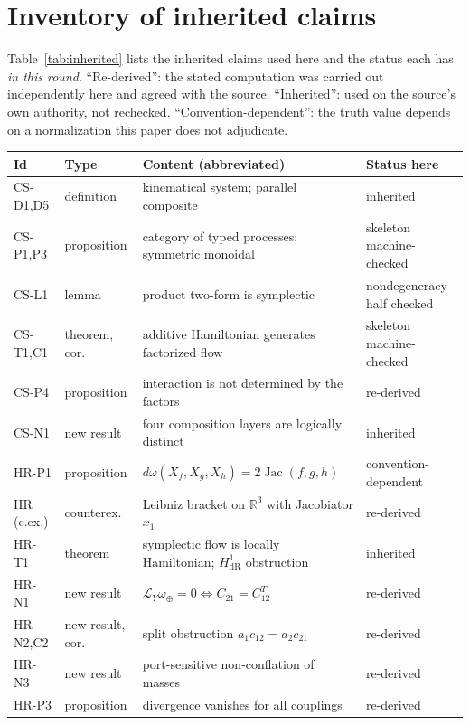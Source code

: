 \documentclass[11pt]{article}
\theoremstyle{plain}
\newcommand{\R}{\mathbb{R}}
\newcommand{\Lie}{\mathcal{L}}
\begin{document}
\section{Inventory of inherited claims}
\label{sec:inventory}

Table~\ref{tab:inherited} lists the inherited claims used here and the status
each has \emph{in this round}. ``Re-derived'': the stated computation was
carried out independently here and agreed with the source. ``Inherited'': used
on the source's own authority, not rechecked. ``Convention-dependent'': the
truth value depends on a normalization this paper does not adjudicate.

\begin{table}[h]
\centering
\footnotesize
\begin{tabular}{@{}llp{6.6cm}l@{}}
\toprule
Id & Type & Content (abbreviated) & Status here \\
\midrule
CS-D1,D5 & definition & kinematical system; parallel composite & inherited \\
CS-P1,P3 & proposition & category of typed processes; symmetric monoidal & skeleton machine-checked \\
CS-L1 & lemma & product two-form is symplectic & nondegeneracy half checked \\
CS-T1,C1 & theorem, cor. & additive Hamiltonian generates factorized flow & skeleton machine-checked \\
CS-P4 & proposition & interaction is not determined by the factors & re-derived \\
CS-N1 & new result & four composition layers are logically distinct & inherited \\
HR-P1 & proposition & $d\omega(X_f,X_g,X_h)=2\operatorname{Jac}(f,g,h)$ & convention-dependent \\
HR (c.ex.) & counterex. & Leibniz bracket on $\R^3$ with Jacobiator $x_1$ & re-derived \\
HR-T1 & theorem & symplectic flow is locally Hamiltonian; $H^1_{\mathrm{dR}}$ obstruction & inherited \\
HR-N1 & new result & $\Lie_Y\omega_\oplus=0 \iff C_{21}=C_{12}^{T}$ & re-derived \\
HR-N2,C2 & new result, cor. & split obstruction $a_1c_{12}=a_2c_{21}$ & re-derived \\
HR-N3 & new result & port-sensitive non-conflation of masses & re-derived \\
HR-P3 & proposition & divergence vanishes for all couplings & re-derived \\

\end{tabular}
\end{table}
\end{document}
